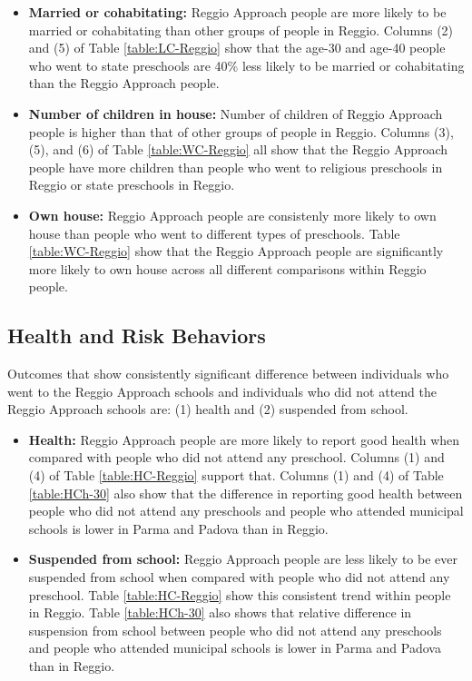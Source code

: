 \documentclass[11pt]{article}
\begin{document}
\begin{itemize}
\item \textbf{Married or cohabitating:} Reggio Approach people are more likely to be married or cohabitating than other groups of people in Reggio. Columns (2) and (5) of Table \ref{table:LC-Reggio} show that the age-30 and age-40 people who went to state preschools are 40\% less likely to be married or cohabitating than the Reggio Approach people. 
\item \textbf{Number of children in house:} Number of children of Reggio Approach people is higher than that of other groups of people in Reggio. Columns (3), (5), and (6) of Table \ref{table:WC-Reggio} all show that the Reggio Approach people have more children than people who went to religious preschools in Reggio or state preschools in Reggio.
\item \textbf{Own house:} Reggio Approach people are consistenly more likely to own house than people who went to different types of preschools. Table \ref{table:WC-Reggio} show that the Reggio Approach people are significantly more likely to own house across all different comparisons within Reggio people. 
\end{itemize}


\subsection{Health and Risk Behaviors}
Outcomes that show consistently significant difference between individuals who went to the Reggio Approach schools and individuals who did not attend the Reggio Approach schools are: (1) health and (2) suspended from school.

\begin{itemize}
\item \textbf{Health:} Reggio Approach people are more likely to report good health when compared with people who did not attend any preschool.  Columns (1) and (4) of Table \ref{table:HC-Reggio} support that. Columns (1) and (4) of Table \ref{table:HCh-30} also show that the difference in reporting good health between people who did not attend any preschools and people who attended municipal schools is lower in Parma and Padova than in Reggio. 

\item \textbf{Suspended from school:} Reggio Approach people are less likely to be ever suspended from school when compared with people who did not attend any preschool. Table \ref{table:HC-Reggio} show this consistent trend within people in Reggio. Table \ref{table:HCh-30} also shows that relative difference in suspension from school between people who did not attend any preschools and people who attended municipal schools is lower in Parma and Padova than in Reggio. 
\end{itemize}
\end{document}
